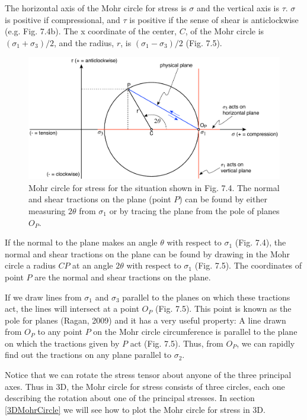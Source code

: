 \documentclass[a4paper , 12pt]{book}
\begin{document}
The horizontal axis of the Mohr circle for stress is $\sigma$ and the vertical axis is $\tau$. $\sigma$ is positive if compressional, and $\tau$ is positive if the sense of shear is anticlockwise (e.g. Fig. 7.4b). The x coordinate of the center, $C$, of the Mohr circle is $(\sigma_1+\sigma_3)/2$, and the radius, $r$, is $(\sigma_1-\sigma_3)/2$ (Fig. 7.5).

\begin{figure}[ht]
    \centering
    \includegraphics[width=14cm]{ch7f5.pdf}
    \caption{Mohr circle for stress for the situation shown in Fig. 7.4. The normal and shear tractions on the plane (point $P$) can be found by either measuring $2\theta$ from $\sigma_1$ or by tracing the plane from the pole of planes $O_P$.} 
    \label{fig:poleOfPlanes}
\end{figure}

If the normal to the plane makes an angle $\theta$ with respect to $\sigma_1$ (Fig. 7.4), the normal and shear tractions on the plane can be found by drawing in the Mohr circle a radius $CP$ at an angle $2\theta$ with respect to $\sigma_1$ (Fig. 7.5). The coordinates of point $P$ are the normal and shear tractions on the plane.

If we draw lines from $\sigma_1$ and $\sigma_3$ parallel to the planes on which these tractions act, the lines will intersect at a point $O_P$ (Fig. 7.5). This point is known as the pole for planes (Ragan, 2009) and it has a very useful property: A line drawn from $O_P$ to any point $P$ on the Mohr circle circumference is parallel to the plane on which the tractions given by $P$ act (Fig. 7.5). Thus, from $O_P$, we can rapidly find out the tractions on any plane parallel to $\sigma_2$. 

Notice that we can rotate the stress tensor about anyone of the three principal axes. Thus in 3D, the Mohr circle for stress consists of three circles, each one describing the rotation about one of the principal stresses. In section \ref{3DMohrCircle} we will see how to plot the Mohr circle for stress in 3D.
\end{document}
